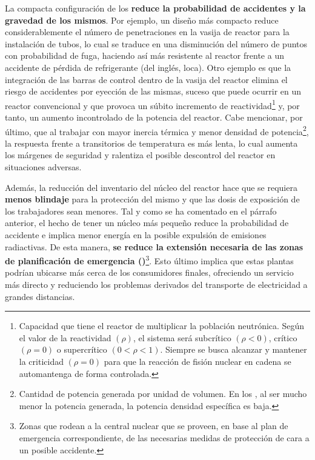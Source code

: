 La compacta configuración de los  \textbf{reduce la probabilidad de accidentes y la gravedad de los mismos}. Por ejemplo, un diseño más compacto reduce considerablemente el número de penetraciones en la vasija de reactor para la instalación de tubos, lo cual se traduce en una disminución del número de puntos con probabilidad de fuga, haciendo así más resistente al reactor frente a un accidente de pérdida de refrigerante (del inglés, \acrshort{loca}). Otro ejemplo es que la integración de las barras de control dentro de la vasija del reactor elimina el riesgo de accidentes por eyección de las mismas, suceso que puede ocurrir en un reactor convencional y que provoca un súbito incremento de \gls{reactividad}\footnote{Capacidad que tiene el reactor de multiplicar la población neutrónica. Según el valor de la reactividad $(\rho)$, el sistema será subcrítico $(\rho<0)$, crítico $(\rho=0)$ o supercrítico $(0<\rho<1)$. Siempre se busca alcanzar y mantener la criticidad $(\rho=0)$ para que la reacción de fisión nuclear en cadena se automantenga de forma controlada.} y, por tanto, un aumento incontrolado de la potencia del reactor. Cabe mencionar, por último, que al trabajar con mayor inercia térmica y menor densidad de potencia\footnote{Cantidad de potencia generada por unidad de volumen. En los , al ser mucho menor la potencia generada, la potencia densidad específica es baja.}, la respuesta frente a transitorios de temperatura es más lenta, lo cual aumenta los márgenes de seguridad y ralentiza el posible descontrol del reactor en situaciones adversas.

Además, la reducción del inventario del núcleo del reactor hace que se requiera \textbf{menos blindaje} para la protección del mismo y que las dosis de exposición de los trabajadores sean menores. Tal y como se ha comentado en el párrafo anterior, el hecho de tener un núcleo más pequeño reduce la probabilidad de accidente e implica menor energía en la posible expulsión de emisiones radiactivas. De esta manera, \textbf{se reduce la extensión necesaria de las zonas de planificación de emergencia ()}\footnote{Zonas que rodean a la central nuclear que se proveen, en base al plan de emergencia correspondiente, de las necesarias medidas de protección de cara a un posible accidente.}. Esto último implica que estas plantas podrían ubicarse más cerca de los consumidores finales, ofreciendo un servicio más directo y reduciendo los problemas derivados del transporte de electricidad a grandes distancias.

